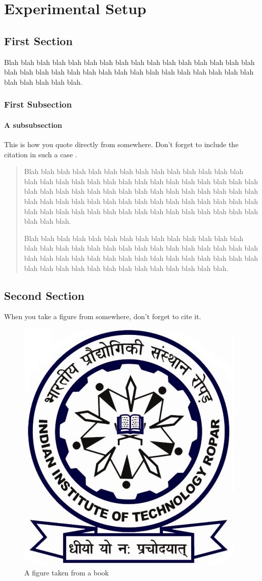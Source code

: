 \chapter{Experimental Setup}
\section{First Section}
Blah blah blah blah blah blah blah blah blah blah blah blah blah blah blah blah blah blah blah blah blah blah blah blah blah blah blah blah blah blah blah blah blah blah blah blah blah.
\subsection{First Subsection}
\subsubsection{A subsubsection}
This is how you quote directly from somewhere. Don't forget to include the citation in such a case \cite{texbook}.
\blockquote{
Blah blah blah blah blah blah blah blah blah blah blah blah blah blah blah blah blah blah blah blah blah blah blah blah blah blah blah blah blah blah blah blah blah blah blah blah blah blah blah blah blah blah blah blah blah blah blah blah blah blah blah blah blah blah blah blah blah blah blah blah blah blah blah blah blah blah blah blah blah blah blah blah blah blah blah blah blah.

Blah blah blah blah blah blah blah blah blah blah blah blah blah blah blah blah blah blah blah blah blah blah blah blah blah blah blah blah blah blah blah blah blah blah blah blah blah blah blah blah blah blah blah blah blah blah blah blah blah blah blah blah blah blah blah blah blah.
}

\section{Second Section}
When you take a figure from somewhere, don't forget to cite it.

\begin{figure}
\caption{A figure taken from a book \cite[Figure~6-3]{latexbook}}
\label{fig:anotherlabelforfigure}
\centering \includegraphics{figures/IITRopar-Logo.jpg}
\end{figure}
